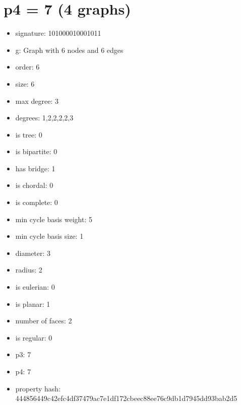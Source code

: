 \chapter{p4 = 7 (4 graphs)}
\newpage\begin{figure}
\end{figure}
\begin{itemize}
\item signature: 101000010001011
\item g: Graph with 6 nodes and 6 edges
\item order: 6
\item size: 6
\item max degree: 3
\item degrees: 1,2,2,2,2,3
\item is tree: 0
\item is bipartite: 0
\item has bridge: 1
\item is chordal: 0
\item is complete: 0
\item min cycle basis weight: 5
\item min cycle basis size: 1
\item diameter: 3
\item radius: 2
\item is eulerian: 0
\item is planar: 1
\item number of faces: 2
\item is regular: 0
\item p3: 7
\item p4: 7
\item property hash: 444856449c42efc4df37479ac7e1df172cbeec88ee76c9db1d7945dd93bab2d5
\end{itemize}
\newpage
\begin{figure}
\end{figure}
